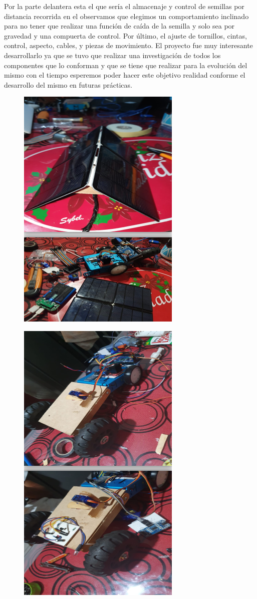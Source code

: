 \documentclass[11pt,a4paper]{article}
\begin{document}
Por la parte delantera esta el que sería el almacenaje y control de semillas por distancia recorrida en el observamos que elegimos un comportamiento inclinado para no tener que realizar una función de caída de la semilla y solo sea por gravedad y una compuerta de control.
Por último, el ajuste de tornillos, cintas, control, aspecto, cables, y piezas de movimiento. El proyecto fue muy interesante desarrollarlo ya que se tuvo que realizar una investigación de todos los componentes que lo conforman y que se tiene que realizar para la evolución del mismo con el tiempo esperemos poder hacer este objetivo realidad conforme el desarrollo del mismo en futuras prácticas.
\begin{figure}[hbtp]
\includegraphics[scale=0.50]{02.png}
\end{figure} 
\begin{figure}[hbtp]
\includegraphics[scale=0.50]{03.png}
\end{figure} 
\end{document}
